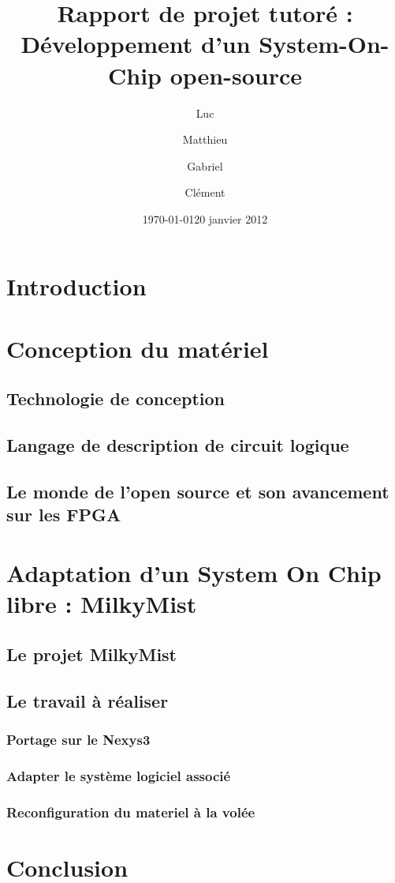 \documentclass{report}
\date{\today}
\author{}
\title{}
\title{Rapport de projet tutoré : Développement d'un System-On-Chip open-source}
\author{\bsc{DUZAN} Luc \and \bsc{LONGO} Matthieu \and \bsc{FARACHE} Gabriel \and \bsc{MICHAUD} Clément }
\date{20 janvier 2012}
\begin{document}
\maketitle

\tableofcontents

\chapter*{Introduction}
    

\chapter{Conception du matériel}

\section{Technologie de conception}
    
    \newpage

\section{Langage de description de circuit logique}
    
    \newpage

\section{Le monde de l'open source et son avancement sur les FPGA}
    
    \newpage

\chapter{Adaptation d'un System On Chip libre : MilkyMist}
\newpage

\section{Le projet MilkyMist}
    
    \newpage

\section{Le travail à réaliser}

\subsection{Portage sur le Nexys3}
    
    \newpage

\subsection{Adapter le système logiciel associé}
    
    \newpage

\subsection{Reconfiguration du materiel à la volée}
    
    \newpage

\chapter*{Conclusion}

\newpage

\end{document}
